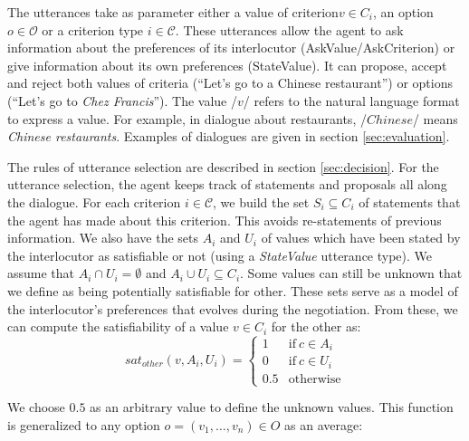 \documentclass{llncs}
\begin{document}
	The utterances take as parameter either a value of criterion$v \in C_i$,  an option $o \in \mathcal{O}$ or a criterion type $i \in \mathcal{C}$. These utterances allow the agent to ask information about the preferences of its interlocutor (AskValue/AskCriterion) or give information about its own preferences (StateValue). It can propose, accept and reject both values of criteria (``Let's go to a Chinese restaurant'') or options (``Let's go to \emph{Chez Francis}''). The value /$v$/ refers to the natural language format to express a value. For example, in dialogue about restaurants, /$Chinese$/ means \textit{Chinese restaurants}. 
	Examples of dialogues are given in section \ref{sec:evaluation}.
	
	\medskip
	The rules of utterance selection are described in section \ref{sec:decision}. For the utterance selection, the agent keeps track of statements and proposals all along the dialogue. For each criterion $i\in\mathcal{C}$, we build the set $S_i \subseteq C_i$ of statements that the agent has made about this criterion. This avoids re-statements of previous information. We also have the sets $A_i$ and $U_i$ of values which have been stated by the interlocutor as satisfiable or not (using a \emph{StateValue} utterance type). We assume that $A_i\cap U_i=\emptyset$ and $A_i\cup U_i\subseteq C_i$. Some values can still be unknown that we define as being potentially satisfiable for other. These sets serve as a model of the interlocutor's preferences that evolves during the negotiation. From these, we can compute the satisfiability of a value $v\in C_i$ for the other as:
		\vspace{-0.5em} 
	\begin{equation}
	sat_{other}(v, A_i, U_i)= \left\{\begin{array}{ll}
	1	 & \mathrm{if\ }  c \in A_i\\
	0    & \mathrm{if\ }c \in U_i\\
	0.5	 & \mathrm{otherwise}
	\end{array}\right.
	\end{equation}
	
	We choose $0.5$ as an arbitrary value to define the unknown values. This function is generalized to any option $o=(v_1,\ldots,v_n) \in O$ as an average:
	
\end{document}
